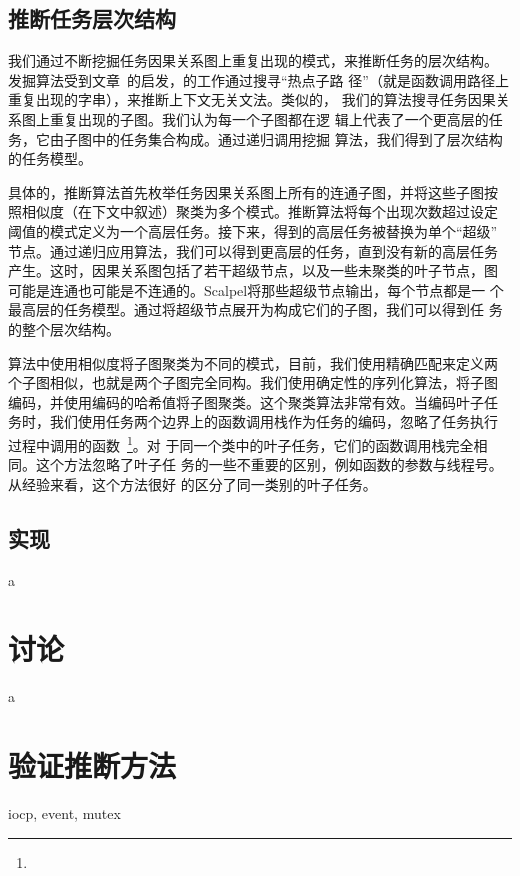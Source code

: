 \subsection{推断任务层次结构}

我们通过不断挖掘任务因果关系图上重复出现的模式，来推断任务的层次结构。
发掘算法受到文章~\cite{s11}的启发，\cite{s11}的工作通过搜寻“热点子路
径”（就是函数调用路径上重复出现的字串），来推断上下文无关文法。类似的，
我们的算法搜寻任务因果关系图上重复出现的子图。我们认为每一个子图都在逻
辑上代表了一个更高层的任务，它由子图中的任务集合构成。通过递归调用挖掘
算法，我们得到了层次结构的任务模型。

具体的，推断算法首先枚举任务因果关系图上所有的连通子图，并将这些子图按
照相似度（在下文中叙述）聚类为多个模式。推断算法将每个出现次数超过设定
阈值的模式定义为一个高层任务。接下来，得到的高层任务被替换为单个“超级”
节点。通过递归应用算法，我们可以得到更高层的任务，直到没有新的高层任务
产生。这时，因果关系图包括了若干超级节点，以及一些未聚类的叶子节点，图
可能是连通也可能是不连通的。Scalpel将那些超级节点输出，每个节点都是一
个最高层的任务模型。通过将超级节点展开为构成它们的子图，我们可以得到任
务的整个层次结构。

算法中使用相似度将子图聚类为不同的模式，目前，我们使用精确匹配来定义两
个子图相似，也就是两个子图完全同构。我们使用确定性的序列化算法，将子图
编码，并使用编码的哈希值将子图聚类。这个聚类算法非常有效。当编码叶子任
务时，我们使用任务两个边界上的函数调用栈作为任务的编码，忽略了任务执行
过程中调用的函数~\footnote{}。对
于同一个类中的叶子任务，它们的函数调用栈完全相同。这个方法忽略了叶子任
务的一些不重要的区别，例如函数的参数与线程号。从经验来看，这个方法很好
的区分了同一类别的叶子任务。


\subsection{实现}

a

\section{讨论}

a

\section{验证推断方法}

iocp, event, mutex

